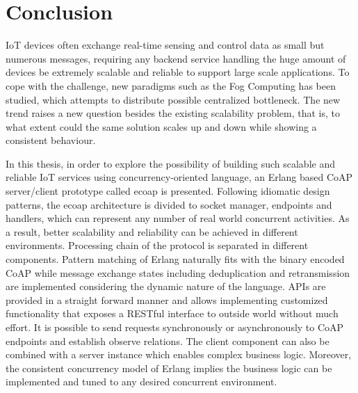 \chapter{Conclusion}\label{ch6}

IoT devices often exchange real-time sensing and control data as small but numerous messages, requiring any backend service handling the huge amount of devices be extremely scalable and reliable to support large scale applications. To cope with the challenge, new paradigms such as the Fog Computing has been studied, which attempts to distribute possible centralized bottleneck. The new trend raises a new question besides the existing scalability problem, that is, to what extent could the same solution scales up and down while showing a consistent behaviour. 

In this thesis, in order to explore the possibility of building such scalable and reliable IoT services using concurrency-oriented language, an Erlang based CoAP server/client prototype called ecoap is presented. Following idiomatic design patterns, the ecoap architecture is divided to socket manager, endpoints and handlers, which can represent any number of real world concurrent activities. As a result, better scalability and reliability can be achieved in different environments. Processing chain of the protocol is separated in different components. Pattern matching of Erlang naturally fits with the binary encoded CoAP while message exchange states including deduplication and retransmission are implemented considering the dynamic nature of the language. APIs are provided in a straight forward manner and allows implementing customized functionality that exposes a RESTful interface to outside world without much effort. It is possible to send requests synchronously or asynchronously to CoAP endpoints and establish observe relations. The client component can also be combined with a server instance which enables complex business logic. Moreover, the consistent concurrency model of Erlang implies the business logic can be implemented and tuned to any desired concurrent environment.

